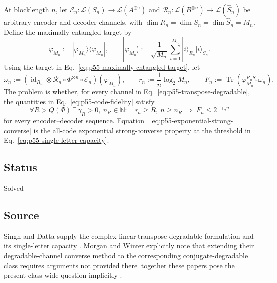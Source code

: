 At blocklength $n$, let
$\mathcal E_n:\mathcal L(S_n)\to\mathcal L(A^{\otimes n})$ and
$\mathcal R_n:\mathcal L(B^{\otimes n})\to\mathcal L(\widehat S_n)$ be
arbitrary encoder and decoder channels, with
$\dim R_n=\dim S_n=\dim\widehat S_n=M_n$.  Define the maximally entangled
target by
\begin{equation}
  \varphi_{M_n}:=
  |\varphi_{M_n}\rangle\!\langle\varphi_{M_n}|,
  \qquad
  |\varphi_{M_n}\rangle
  :=\frac1{\sqrt{M_n}}\sum_{i=1}^{M_n}|i\rangle_{R_n}|i\rangle_{S_n}.
  \label{eq:p55-maximally-entangled-target}
\end{equation}
Using the target in Eq.~\eqref{eq:p55-maximally-entangled-target}, let
\begin{equation}
  \omega_n:=
  \left(\operatorname{id}_{R_n}\otimes
  \mathcal R_n\circ\Phi^{\otimes n}\circ\mathcal E_n\right)(\varphi_{M_n}),
  \qquad
  r_n:=\frac1n\log_2M_n,
  \qquad
  F_n:=\operatorname{Tr}(\varphi_{M_n}^{R_n\widehat S_n}\omega_n).
  \label{eq:p55-code-fidelity}
\end{equation}
The problem is whether, for every channel in
Eq.~\eqref{eq:p55-transpose-degradable}, the quantities in
Eq.~\eqref{eq:p55-code-fidelity} satisfy
\begin{equation}
  \forall R>Q(\Phi)\ \exists\,\gamma_R>0,\ n_R\in\mathbb N:
  \quad
  r_n\geq R,\ n\geq n_R
  \ \Longrightarrow\
  F_n\leq2^{-\gamma_R n}
  \label{eq:p55-exponential-strong-converse}
\end{equation}
for every encoder--decoder sequence.  Equation~
\eqref{eq:p55-exponential-strong-converse} is the all-code exponential
strong-converse property at the threshold in
Eq.~\eqref{eq:p55-single-letter-capacity}.

\subsection*{Status}

Solved

\subsection*{Source}

Singh and Datta supply the complex-linear transpose-degradable formulation and
its single-letter capacity
.  Morgan and Winter explicitly note
that extending their degradable-channel converse method to the corresponding
conjugate-degradable class requires arguments not provided there; together
these papers pose the present class-wide question implicitly
.


